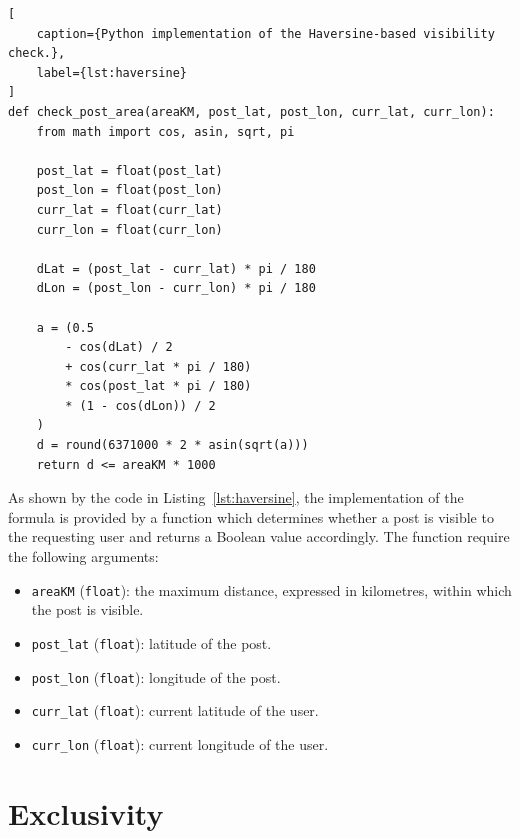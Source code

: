 

\begin{lstlisting}[
    caption={Python implementation of the Haversine-based visibility check.},
    label={lst:haversine}
]
def check_post_area(areaKM, post_lat, post_lon, curr_lat, curr_lon):
    from math import cos, asin, sqrt, pi

    post_lat = float(post_lat)
    post_lon = float(post_lon)
    curr_lat = float(curr_lat)
    curr_lon = float(curr_lon)

    dLat = (post_lat - curr_lat) * pi / 180
    dLon = (post_lon - curr_lon) * pi / 180

    a = (0.5
        - cos(dLat) / 2
        + cos(curr_lat * pi / 180)
        * cos(post_lat * pi / 180)
        * (1 - cos(dLon)) / 2
    )
    d = round(6371000 * 2 * asin(sqrt(a)))
    return d <= areaKM * 1000
\end{lstlisting}

As shown by the code in Listing~\ref{lst:haversine}, the implementation of the formula is provided by a function which determines whether a post is visible to the requesting user and returns a Boolean value accordingly. The function require the following arguments:
\begin{itemize}
    \item \texttt{areaKM} (\texttt{float}): the maximum distance, expressed in kilometres,
    within which the post is visible.

    \item \texttt{post\_lat} (\texttt{float}): latitude of the post.

    \item \texttt{post\_lon} (\texttt{float}): longitude of the post.

    \item \texttt{curr\_lat} (\texttt{float}): current latitude of the user.

    \item \texttt{curr\_lon} (\texttt{float}): current longitude of the user.
\end{itemize}

\section{Exclusivity}

